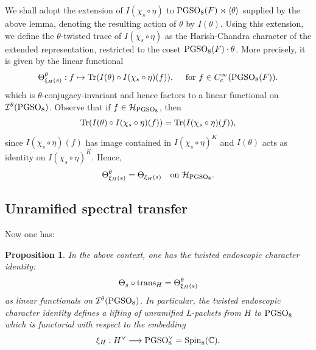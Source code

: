 \documentclass[11pt]{amsart}
\theoremstyle{plain}
\newtheorem{prop}[equation]{Proposition}
\numberwithin{equation}{section}
\newcommand{\C}{\mathbb C}
\def\PGSO{{\rm PGSO}}
\def\Spin{{\rm Spin}}
\def\Spin{{\rm Spin}}
\def\C{{\bf C}}
\def\C{{\mathbb C}}
\begin{document}
We shall adopt the extension of $I(\chi_s \circ \eta)$ to $\PGSO_8(F) \rtimes \langle \theta \rangle$  supplied by the above lemma, denoting the resulting action of $\theta$  by $I(\theta)$. Using this extension, we define the $\theta$-twisted trace of $I(\chi_s \circ \eta)$ as the Harish-Chandra character of the extended representation, restricted to the coset $\PGSO_8(F) \cdot \theta$.  
More precisely, it is given by  the linear functional
\[  \Theta^{\theta}_{\xi_H(s)}:  f \mapsto   {\rm Tr}( I(\theta) \circ  I(\chi_s \circ \eta)(f) ), \quad \text{ for $f \in C^{\infty}_c(\PGSO_8(F))$.} \]
which is $\theta$-conjugacy-invariant  and hence factors to a linear functional on $\mathcal{I}^{\theta}(\PGSO_8)$.
Observe that if $f \in \mathcal{H}_{\PGSO_8}$, then 
\[   {\rm Tr}( I(\theta) \circ  I(\chi_s \circ \eta)(f) ) =  {\rm Tr}(  I(\chi_s \circ \eta)(f) ), \]
since  $I(\chi_s \circ \eta)(f)$ has image  contained in $I(\chi_s \circ \eta)^K$ and $I(\theta)$ acts as identity on $I(\chi_s \circ \eta)^K$. 
Hence, 
\[ \Theta^{\theta}_{\xi_H(s)} = \Theta_{\xi_H(s)} \quad \text{on $\mathcal{H}_{\PGSO_8}$.} \]
\vskip 5pt

\subsection{\bf Unramified spectral transfer}
Now one has:
\vskip 5pt

\begin{prop} \label{P:unram-spec-T}
In the above context,  one has the twisted endoscopic character identity:
\[  \Theta_s \circ {\rm trans}_H = \Theta^{\theta}_{\xi_H(s)}   \]
as linear functionals on $\mathcal{I}^{\theta}(\PGSO_8)$. In particular, the twisted endoscopic character identity defines a lifting of unramified L-packets from $H$ to $\PGSO_8$ which is functorial with respect to the embedding
\[  \xi_H: H^{\vee} \longrightarrow \PGSO_8^{\vee} = \Spin_8(\C). \] 
\end{prop}
\vskip 5pt
\end{document}
